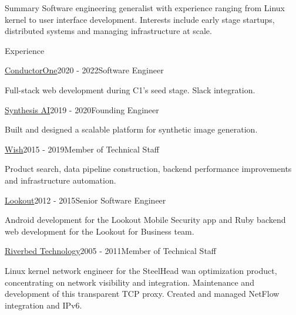 \documentclass{resume} %
\begin{document}
\begin{rSection}{Summary}
Software engineering generalist with experience ranging from Linux kernel to user interface development. Interests include
early stage startups, distributed systems and managing infrastructure at scale.
\end{rSection}

\begin{rSection}{Experience}

\begin{rSubsection}{\href{https://conductorone.com}{ConductorOne}}{2020 - 2022}{Software Engineer}{}
\item Full-stack web development during C1's seed stage. Slack integration.
\end{rSubsection}

\begin{rSubsection}{\href{https://synthesis.ai}{Synthesis AI}}{2019 - 2020}{Founding Engineer}{}
\item Built and designed a scalable platform for synthetic image generation.
\end{rSubsection}

\begin{rSubsection}{\href{https://wish.com}{Wish}}{2015 - 2019}{Member of Technical Staff}{}
\item Product search, data pipeline construction, backend performance improvements and infrastructure automation.
\end{rSubsection}

\begin{rSubsection}{\href{https://lookout.com}{Lookout}}{2012 - 2015}{Senior Software Engineer}{}
\item Android development for the Lookout Mobile Security app and Ruby backend web development for the Lookout for Business team.
\end{rSubsection}

\begin{rSubsection}{\href{https://riverbed.com}{Riverbed Technology}}{2005 - 2011}{Member of Technical Staff}{}
\item Linux kernel network engineer for the SteelHead wan optimization product, concentrating on network visibility
  and integration. Maintenance and development of this transparent TCP proxy. Created and managed NetFlow integration and IPv6.
\end{rSubsection}

\end{rSection}
\end{document}
